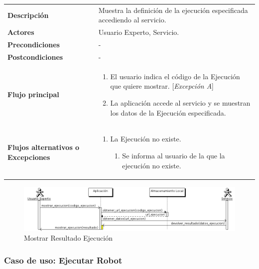 \begin{tabular}[h]{ p{ } p{ }}

\textbf{Descripción} & Muestra la definición de la ejecución
especificada accediendo al servicio. \\[3mm]

\textbf{Actores} & Usuario Experto, Servicio.\\[3mm]

\textbf{Precondiciones} & - \\[3mm]

\textbf{Postcondiciones} & - \\[3mm]

\textbf{Flujo principal} & \begin{enumerate}[leftmargin=1em,topsep=0pt, partopsep=0pt]
  \item El usuario indica el código de la Ejecución que quiere mostrar. [\emph{Excepción A}]
  \item La aplicación accede al servicio y se muestran los datos de la
    Ejecución especificada.
\end{enumerate}\\[3mm]

\textbf{Flujos alternativos o Excepciones} &
\begin{enumerate}[label=\Alph*:,leftmargin=1em,topsep=0pt, partopsep=0pt]
\item La Ejecución no existe.
  \begin{enumerate}[label=\arabic*.,topsep=0pt, partopsep=0pt]
    \item Se informa al usuario de la que la ejecución no existe.
  \end{enumerate}
\end{enumerate}\\[3mm]
\end{tabular}

\begin{figure}[bp!]
  \includegraphics[width=1\textwidth]{chapters/technical-manual/diagrams/sequence/expert_user/mostrar_resultado_ejecucion.png}
\caption{Mostrar Resultado Ejecución}
\end{figure}
\clearpage

\subsubsection{\large{Caso de uso: Ejecutar Robot}}

